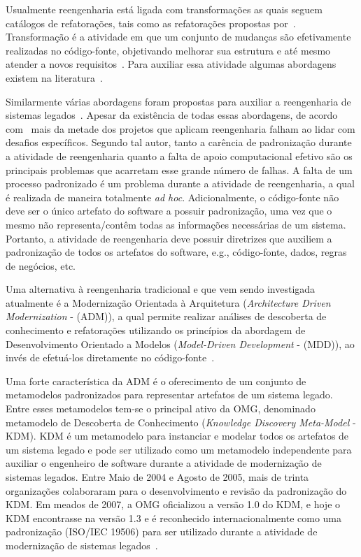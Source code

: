  



Usualmente reengenharia está ligada com transformações as quais seguem catálogos de refatorações, tais como as refatorações propostas por~\citet{refactImpro}. Transformação é a atividade em que um conjunto de mudanças são efetivamente realizadas no código-fonte, objetivando melhorar sua estrutura e até mesmo atender a novos requisitos~\cite{Griswold}. Para auxiliar essa atividade algumas abordagens existem na literatura~\cite{bisbal, tilley, refactImpro}.

Similarmente várias abordagens foram propostas para auxiliar a reengenharia de sistemas legados~\cite{Griffith2011, Olszak:2012:RJP:2108329.2108539}.
Apesar da existência de todas essas abordagens, de acordo com~\citet{Sneed:2005} mais da metade dos projetos que aplicam reengenharia falham ao lidar com desafios específicos. Segundo tal autor, tanto a carência de  padronização durante a atividade de reengenharia quanto a falta de apoio computacional efetivo são os principais problemas que acarretam esse grande número de falhas.  A falta de um processo padronizado é um problema durante a atividade de reengenharia, a qual é realizada de maneira totalmente \textit{ad hoc}. Adicionalmente, o código-fonte não deve ser o único artefato do software a possuir padronização, uma vez que o mesmo não representa/contêm todas as informações necessárias de um sistema. Portanto, a atividade de reengenharia deve possuir diretrizes que auxiliem a padronização de todos os artefatos do software, e.g., código-fonte, dados, regras de negócios, etc.


Uma alternativa à reengenharia tradicional e que vem sendo investigada atualmente é a Modernização Orientada à Arquitetura (\textit{Architecture Driven Modernization} - (ADM)), a qual permite realizar análises de descoberta de conhecimento e refatorações utilizando os princípios da abordagem de Desenvolvimento Orientado a Modelos (\textit{Model-Driven Development} - (MDD)), ao invés de efetuá-los diretamente no código-fonte~\cite{PerezCastillo:2011jo}. 

Uma forte característica da ADM é o oferecimento de um conjunto de metamodelos padronizados para representar artefatos de um sistema legado. Entre esses metamodelos tem-se o principal ativo da OMG, denominado metamodelo de Descoberta de Conhecimento (\textit{Knowledge Discovery Meta-Model} - KDM). KDM é um metamodelo para instanciar e modelar todos os artefatos de um sistema legado e pode ser utilizado como um metamodelo independente para auxiliar o engenheiro de software durante a atividade de modernização de sistemas legados. Entre Maio de 2004 e Agosto de 2005, mais de trinta organizações colaboraram para o desenvolvimento e revisão da padronização do KDM. Em meados de 2007, a OMG oficializou a versão 1.0 do KDM, e hoje o KDM encontrasse na versão 1.3 e é reconhecido internacionalmente como uma padronização (ISO/IEC 19506) para ser utilizado durante a atividade de modernização de sistemas legados~\cite{ISOKDM}. 


